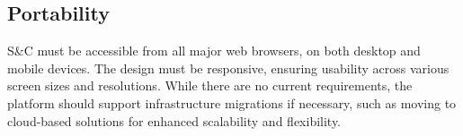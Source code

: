 \subsection{Portability}
S\&C must be accessible from all major web browsers, on both desktop and mobile devices.
The design must be responsive, ensuring usability across various screen sizes and resolutions.
While there are no current requirements, the platform should support infrastructure migrations if necessary, such as moving to cloud-based solutions for enhanced scalability and flexibility.
